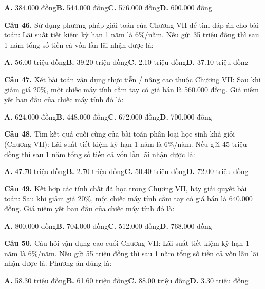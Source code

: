 \documentclass[11pt,a4paper]{article}
\begin{document}
\hspace*{1.5em}\textbf{A.} 384.000 đồng\quad\quad \textbf{B.} 544.000 đồng\quad\quad \textbf{C.} 576.000 đồng\quad\quad \textbf{D.} 600.000 đồng\par\vspace{2pt}
\textbf{\color{primary} Câu 46.} Sử dụng phương pháp giải toán của Chương VII để tìm đáp án cho bài toán: Lãi suất tiết kiệm kỳ hạn 1 năm là 6\%/năm. Nếu gửi 35 triệu đồng thì sau 1 năm tổng số tiền cả vốn lẫn lãi nhận được là:\par
\hspace*{1.5em}\textbf{A.} 56.00 triệu đồng\quad\quad \textbf{B.} 39.20 triệu đồng\quad\quad \textbf{C.} 2.10 triệu đồng\quad\quad \textbf{D.} 37.10 triệu đồng\par\vspace{2pt}
\textbf{\color{primary} Câu 47.} Xét bài toán vận dụng thực tiễn / nâng cao thuộc Chương VII: Sau khi giảm giá 20\%, một chiếc máy tính cầm tay có giá bán là 560.000 đồng. Giá niêm yết ban đầu của chiếc máy tính đó là:\par
\hspace*{1.5em}\textbf{A.} 624.000 đồng\quad\quad \textbf{B.} 448.000 đồng\quad\quad \textbf{C.} 672.000 đồng\quad\quad \textbf{D.} 700.000 đồng\par\vspace{2pt}
\textbf{\color{primary} Câu 48.} Tìm kết quả cuối cùng của bài toán phân loại học sinh khá giỏi (Chương VII): Lãi suất tiết kiệm kỳ hạn 1 năm là 6\%/năm. Nếu gửi 45 triệu đồng thì sau 1 năm tổng số tiền cả vốn lẫn lãi nhận được là:\par
\hspace*{1.5em}\textbf{A.} 47.70 triệu đồng\quad\quad \textbf{B.} 2.70 triệu đồng\quad\quad \textbf{C.} 50.40 triệu đồng\quad\quad \textbf{D.} 72.00 triệu đồng\par\vspace{2pt}
\textbf{\color{primary} Câu 49.} Kết hợp các tính chất đã học trong Chương VII, hãy giải quyết bài toán: Sau khi giảm giá 20\%, một chiếc máy tính cầm tay có giá bán là 640.000 đồng. Giá niêm yết ban đầu của chiếc máy tính đó là:\par
\hspace*{1.5em}\textbf{A.} 800.000 đồng\quad\quad \textbf{B.} 704.000 đồng\quad\quad \textbf{C.} 512.000 đồng\quad\quad \textbf{D.} 768.000 đồng\par\vspace{2pt}
\textbf{\color{primary} Câu 50.} Câu hỏi vận dụng cao cuối Chương VII: Lãi suất tiết kiệm kỳ hạn 1 năm là 6\%/năm. Nếu gửi 55 triệu đồng thì sau 1 năm tổng số tiền cả vốn lẫn lãi nhận được là. Phương án đúng là:\par
\hspace*{1.5em}\textbf{A.} 58.30 triệu đồng\quad\quad \textbf{B.} 61.60 triệu đồng\quad\quad \textbf{C.} 88.00 triệu đồng\quad\quad \textbf{D.} 3.30 triệu đồng\par\vspace{2pt}
\end{document}
